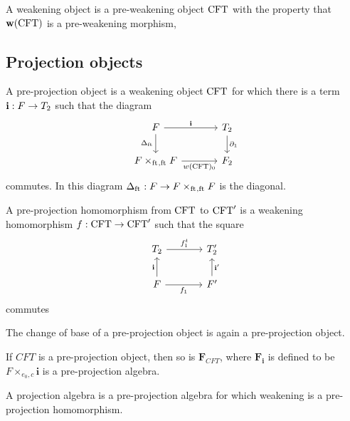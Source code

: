 \begin{defn}
A weakening object is a pre-weakening object $\mathrm{CFT}$ with the property that
$\mathbf{w}(\mathrm{CFT})$ is a pre-weakening morphism,
\end{defn}

\subsection{Projection objects}
\begin{defn}
A pre-projection object is a weakening object $\mathrm{CFT}$ for which there is a term
$\mathbf{i}:F\to T_2$ such that the diagram
\begin{equation*}
\begin{tikzcd}[column sep=large]
\stesysf \ar{r}{\mathbf{i}} \ar{d}[swap]{\Delta_{\eft}} & \stesyst_2 \ar{d}{\ebd[1]}\\
\pullback{\stesysf}{\stesysf}{\eft}{\eft} \ar{r}[swap]{w(\stesys)_0} & \stesysf_2
\end{tikzcd}
\end{equation*}
commutes. In this diagram $\Delta_{\eft}:\stesysf\to \pullback{\stesysf}{\stesysf}{\eft}{\eft}$ is the diagonal.
\end{defn}

\begin{defn}
A pre-projection homomorphism from $\mathrm{CFT}$ to $\mathrm{CFT}'$ is a weakening homomorphism
$f:\mathrm{CFT}\to \mathrm{CFT}'$ such that the square
\begin{equation*}
\begin{tikzcd}[column sep=large]
\stesyst_2
  \ar{r}{f^t_1}
  &
\stesyst_2'
  \\
\stesysf \ar{r}[swap]{f_1}
  \ar{u}{\mathbf{i}}
  &
\stesysf'
  \ar{u}[swap]{\mathbf{i}'}
\end{tikzcd}
\end{equation*}
commutes
\end{defn}

\begin{lem}
The change of base of a pre-projection object is again a pre-projection object.
\end{lem}

\begin{lem}
If $CFT$ is a pre-projection object, then so is $\mathbf{F}_{CFT}$, where
$\mathbf{F}_{\mathbf{i}}$ is defined to be $F\times_{e_0,c}\mathbf{i}$ is
a pre-projection algebra.
\end{lem}

\begin{defn}
A projection algebra is a pre-projection algebra for which weakening is a
pre-projection homomorphism.
\end{defn}

